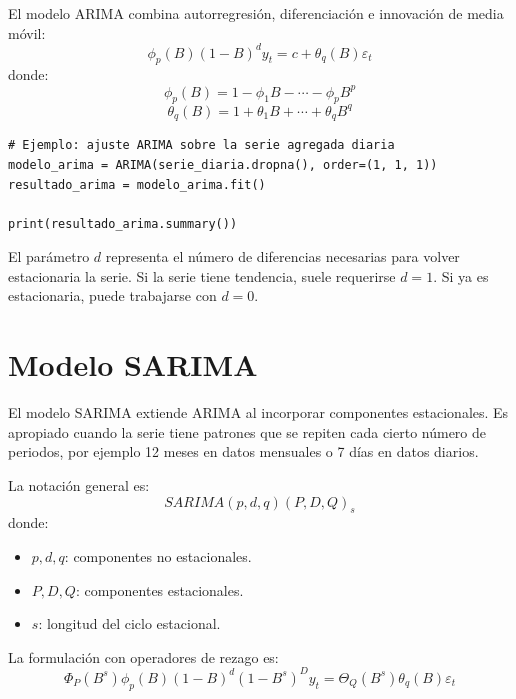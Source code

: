 \documentclass[12pt,a4paper]{article}
\begin{document}
\begin{latexcell}
El modelo ARIMA combina autorregresión, diferenciación e innovación de media móvil:
\[
\phi_p(B)(1-B)^d y_t = c + \theta_q(B)\varepsilon_t
\]
donde:
\[
\phi_p(B)=1-\phi_1B-\cdots-\phi_pB^p
\]
\[
\theta_q(B)=1+\theta_1B+\cdots+\theta_qB^q
\]
\end{latexcell}

\begin{lstlisting}[style=pythonstyle]
# Ejemplo: ajuste ARIMA sobre la serie agregada diaria
modelo_arima = ARIMA(serie_diaria.dropna(), order=(1, 1, 1))
resultado_arima = modelo_arima.fit()

print(resultado_arima.summary())
\end{lstlisting}

\begin{interpretacion}
El parámetro \(d\) representa el número de diferencias necesarias para volver estacionaria la serie. Si la serie tiene tendencia, suele requerirse \(d=1\). Si ya es estacionaria, puede trabajarse con \(d=0\).
\end{interpretacion}

\section{Modelo SARIMA}

\begin{markdowncell}
El modelo SARIMA extiende ARIMA al incorporar componentes estacionales. Es apropiado cuando la serie tiene patrones que se repiten cada cierto número de periodos, por ejemplo 12 meses en datos mensuales o 7 días en datos diarios.
\end{markdowncell}

\begin{latexcell}
La notación general es:
\[
SARIMA(p,d,q)(P,D,Q)_s
\]
donde:
\begin{itemize}
    \item \(p,d,q\): componentes no estacionales.
    \item \(P,D,Q\): componentes estacionales.
    \item \(s\): longitud del ciclo estacional.
\end{itemize}
\end{latexcell}

\begin{latexcell}
La formulación con operadores de rezago es:
\[
\Phi_P(B^s)\phi_p(B)(1-B)^d(1-B^s)^D y_t =
\Theta_Q(B^s)\theta_q(B)\varepsilon_t
\]
\end{latexcell}
\end{document}
